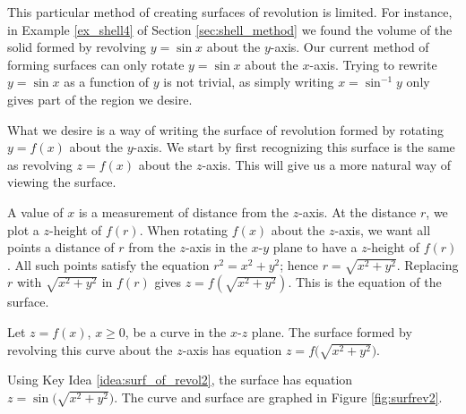 This particular method of creating surfaces of revolution is limited. For instance, in Example \ref{ex_shell4} of Section \ref{sec:shell_method} we found the volume  of the solid formed by revolving $y=\sin x$ about the $y$-axis. Our current method of forming surfaces can only rotate $y=\sin x$ about the $x$-axis. Trying to rewrite $y=\sin x$ as a function of $y$ is not trivial, as simply writing $x=\sin^{-1}y$ only gives part of the region we desire.

What we desire is a way of writing the surface of revolution formed by rotating $y=f(x)$ about the $y$-axis. We start by first recognizing this surface is the same as revolving $z=f(x)$ about the $z$-axis. This will give us a more natural way of viewing the surface. 

A value of $x$ is a measurement of distance from the $z$-axis. At the distance $r$, we plot a $z$-height of $f(r)$. When rotating $f(x)$ about the $z$-axis, we want all points a distance of $r$ from the $z$-axis in the $x$-$y$ plane to have a $z$-height of $f(r)$. All such points satisfy the equation $r^2=x^2+y^2$; hence $r=\sqrt{x^2+y^2}$. Replacing $r$ with $\sqrt{x^2+y^2}$ in $f(r)$ gives $z=f(\sqrt{x^2+y^2})$. This is the equation of the surface.

{Let $z=f(x)$, $x\geq 0$, be a curve in the $x$-$z$ plane. The surface formed by revolving this curve about the $z$-axis has equation $z=f\big(\sqrt{x^2+y^2}\big)$.
}

{Using Key Idea \ref{idea:surf_of_revol2}, the surface has equation $z=\sin\big(\sqrt{x^2+y^2}\big)$. The curve and surface are graphed in Figure \ref{fig:surfrev2}.
}\\
\clearpage


